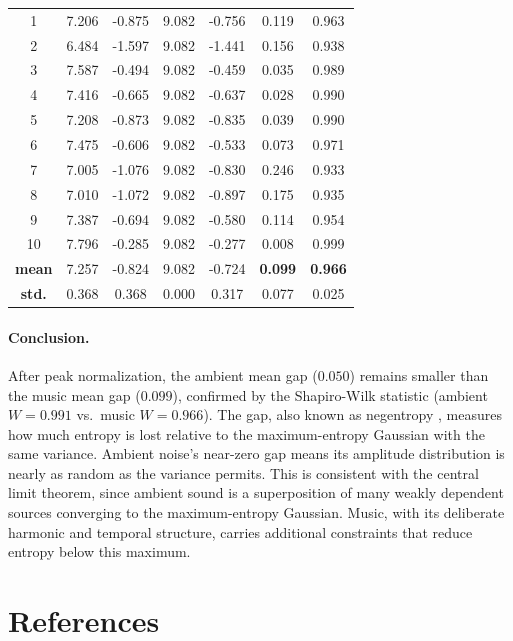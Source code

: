 \documentclass[a4paper,10pt]{article}
\theoremstyle{nonumberplain}
\theoremstyle{nonumberplain}
\theoremstyle{nonumberplain}
\theoremstyle{nonumberplain}
\begin{document}
\begin{table}[H]
{\begin{minipage}[t]{0.48\textwidth}
\begin{tabular}{c c c c c c c}
            \hline
            1 & 7.206 & -0.875 & 9.082 & -0.756 & 0.119 & 0.963 \\
            2 & 6.484 & -1.597 & 9.082 & -1.441 & 0.156 & 0.938 \\
            3 & 7.587 & -0.494 & 9.082 & -0.459 & 0.035 & 0.989 \\
            4 & 7.416 & -0.665 & 9.082 & -0.637 & 0.028 & 0.990 \\
            5 & 7.208 & -0.873 & 9.082 & -0.835 & 0.039 & 0.990 \\
            6 & 7.475 & -0.606 & 9.082 & -0.533 & 0.073 & 0.971 \\
            7 & 7.005 & -1.076 & 9.082 & -0.830 & 0.246 & 0.933 \\
            8 & 7.010 & -1.072 & 9.082 & -0.897 & 0.175 & 0.935 \\
            9 & 7.387 & -0.694 & 9.082 & -0.580 & 0.114 & 0.954 \\
            10 & 7.796 & -0.285 & 9.082 & -0.277 & 0.008 & 0.999 \\
            \hline
            \textbf{mean} & 7.257 & -0.824 & 9.082 & -0.724 & \textbf{0.099} & \textbf{0.966} \\
            \textbf{std.} & 0.368 & 0.368 & 0.000 & 0.317 & 0.077 & 0.025 \\
            \hline
        \end{tabular}
    \end{minipage}
    }
\end{table}

\paragraph{Conclusion.}
After peak normalization, the ambient mean gap ($0.050$) remains smaller than the music mean gap ($0.099$), confirmed by the Shapiro-Wilk statistic (ambient $W = 0.991$ vs.\ music $W = 0.966$). The gap, also known as negentropy \citep{cover2006}, measures how much entropy is lost relative to the maximum-entropy Gaussian with the same variance. Ambient noise's near-zero gap means its amplitude distribution is nearly as random as the variance permits. This is consistent with the central limit theorem, since ambient sound is a superposition of many weakly dependent sources converging to the maximum-entropy Gaussian. Music, with its deliberate harmonic and temporal structure, carries additional constraints that reduce entropy below this maximum.

\section{References}
\renewcommand{\refname}{}
\vspace{-1cm}
\end{document}
